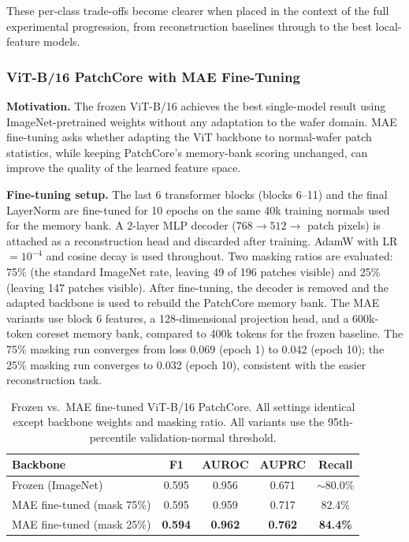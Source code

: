\documentclass[11pt]{article}
\begin{document}
These per-class trade-offs become clearer when placed in the context of the full experimental progression, from reconstruction baselines through to the best local-feature models.

\subsubsection{ViT-B/16 PatchCore with MAE Fine-Tuning}

\textbf{Motivation.} The frozen ViT-B/16 achieves the best single-model result using ImageNet-pretrained weights without any adaptation to the wafer domain. MAE fine-tuning asks whether adapting the ViT backbone to normal-wafer patch statistics, while keeping PatchCore's memory-bank scoring unchanged, can improve the quality of the learned feature space.

\textbf{Fine-tuning setup.} The last 6 transformer blocks (blocks 6--11) and the final LayerNorm are fine-tuned for 10 epochs on the same 40k training normals used for the memory bank. A 2-layer MLP decoder ($768 \to 512 \to$ patch pixels) is attached as a reconstruction head and discarded after training. AdamW with LR $=10^{-4}$ and cosine decay is used throughout. Two masking ratios are evaluated: 75\% (the standard ImageNet rate, leaving 49 of 196 patches visible) and 25\% (leaving 147 patches visible). After fine-tuning, the decoder is removed and the adapted backbone is used to rebuild the PatchCore memory bank. The MAE variants use block 6 features, a 128-dimensional projection head, and a 600k-token coreset memory bank, compared to 400k tokens for the frozen baseline. The 75\% masking run converges from loss 0.069 (epoch 1) to 0.042 (epoch 10); the 25\% masking run converges to 0.032 (epoch 10), consistent with the easier reconstruction task.

\begin{table}[H]
\centering
\caption{Frozen vs.\ MAE fine-tuned ViT-B/16 PatchCore. All settings identical except backbone weights and masking ratio. All variants use the 95th-percentile validation-normal threshold.}
\label{tab:vit_mae_comparison}
\begin{tabular}{lcccc}
\toprule
Backbone & F1 & AUROC & AUPRC & Recall \\
\midrule
Frozen (ImageNet)          & 0.595          & 0.956          & 0.671          & ${\sim}$80.0\% \\
MAE fine-tuned (mask 75\%) & 0.595          & 0.959          & 0.717          & 82.4\% \\
MAE fine-tuned (mask 25\%) & \textbf{0.594} & \textbf{0.962} & \textbf{0.762} & \textbf{84.4\%} \\
\bottomrule
\end{tabular}
\end{table}
\end{document}
